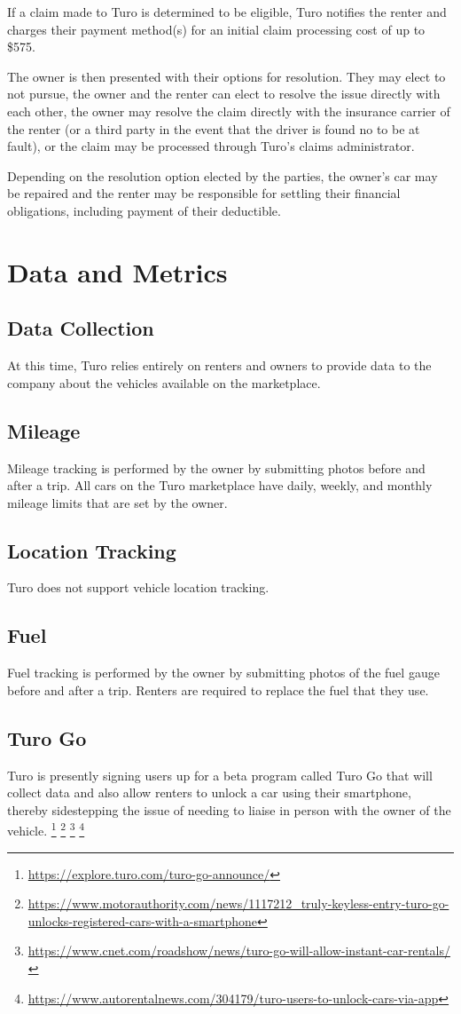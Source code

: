 \documentclass[review,12pt]{elsarticle}
\begin{document}
If a claim made to Turo is determined to be eligible, Turo notifies the renter and charges their payment method(s) for an initial claim processing cost of up to \$575.

The owner is then presented with their options for resolution. They may elect to not pursue, the owner and the renter can elect to resolve the issue directly with each other, the owner may resolve the claim directly with the insurance carrier of the renter (or a third party in the event that the driver is found no to be at fault), or the claim may be processed through Turo's claims administrator.

Depending on the resolution option elected by the parties, the owner's car may be repaired and the renter may be responsible for settling their financial obligations, including payment of their deductible.

\section{Data and Metrics}
  \subsection{Data Collection}
  At this time, Turo relies entirely on renters and owners to provide data to the company about the vehicles available on the marketplace.
  \subsection{Mileage}
  Mileage tracking is performed by the owner by submitting photos before and after a trip. All cars on the Turo marketplace have daily, weekly, and monthly mileage limits that are set by the owner.
  \subsection{Location Tracking}
  Turo does not support vehicle location tracking.
  \subsection{Fuel}
  Fuel tracking is performed by the owner by submitting photos of the fuel gauge before and after a trip. Renters are required to replace the fuel that they use.
  \subsection{Turo Go}
  Turo is presently signing users up for a beta program called Turo Go that will collect data and also allow renters to unlock a car using their smartphone, thereby sidestepping the issue of needing to liaise in person with the owner of the vehicle.
  \footnote{\url{https://explore.turo.com/turo-go-announce/}}
  \footnote{\url{https://www.motorauthority.com/news/1117212_truly-keyless-entry-turo-go-unlocks-registered-cars-with-a-smartphone}
  }
  \footnote{\url{https://www.cnet.com/roadshow/news/turo-go-will-allow-instant-car-rentals/}
  }
  \footnote{\url{https://www.autorentalnews.com/304179/turo-users-to-unlock-cars-via-app}
  }
\end{document}
